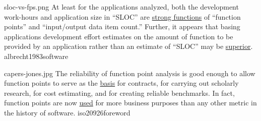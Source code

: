 \documentclass{article}
\begin{document}

\qte
  {sloc-vs-fps.png}
  {At least for the applications analyzed, both the development work-hours and application size in ``SLOC'' are \ul{strong functions} of ``function points'' and ``input/output data item count.'' Further, it appears that basing applications development effort estimates on the amount of function to be provided by an application rather than an estimate of ``SLOC'' may be \ul{superior}.}
  {albrecht1983software}

\qte
  {capers-jones.jpg}
  {The reliability of function point analysis is good enough to allow function points to serve as the \ul{basis} for contracts, for carrying out scholarly research, for cost estimating, and for creating reliable benchmarks. In fact, function points are now \ul{used} for more business purposes than any other metric in the history of software.}
  {iso20926foreword}

\end{document}
